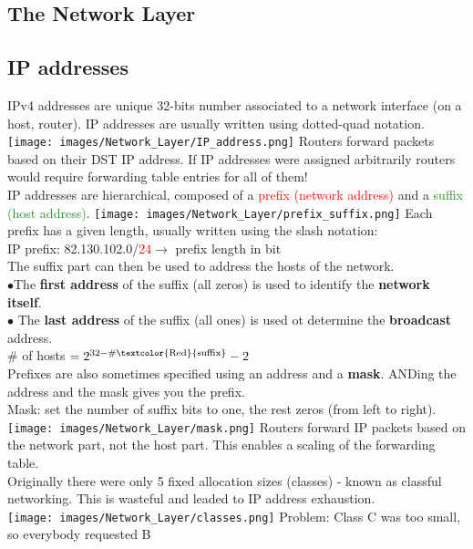 \documentclass[a4paper, fontsize=8pt, landscape, DIV=1]{scrartcl}
\begin{document}
\begin{multicols*}{4}
   		\section{The Network Layer}
   		\subsection{IP addresses}
   		IPv4 addresses are unique 32-bits number associated to a network interface (on a host, router). IP addresses are usually written using dotted-quad notation. 
   		\texttt{[image: images/Network\_Layer/IP\_address.png]}
   		Routers forward packets based on their DST IP address. If IP addresses were assigned arbitrarily routers would require forwarding table entries for all of them!\\
   		IP addresses are hierarchical, composed of a\textcolor{Red}{ prefix (network address)} and a \textcolor{ForestGreen}{suffix (host address)}. 
   		\texttt{[image: images/Network\_Layer/prefix\_suffix.png]}
   		Each prefix has a given length, usually written using the slash notation:\\
   		IP prefix: 82.130.102.0/\textcolor{Red}{24}$\rightarrow$ prefix length in bit\\
   		The suffix part can then be used to address the hosts of the network.\\
   		$\bullet$The \textbf{first address} of the suffix (all zeros) is used to identify the \textbf{network itself}.\\
   		$\bullet$ The \textbf{last address} of the suffix (all ones) is used ot determine the \textbf{broadcast} address.\\
   		\# of hosts $= 2^{32-\#\mathrm{\textcolor{Red}{suffix}}}-2$\\
   		Prefixes are also sometimes specified using an address and a \textbf{mask}. ANDing the address and the mask gives you the prefix. \\
   		Mask: set the number of suffix bits to one, the rest zeros (from left to right).\\
   		\texttt{[image: images/Network\_Layer/mask.png]}
   		Routers forward IP packets based on the network part, not the host part. This enables a scaling of the forwarding table. \\
   		Originally there were only 5 fixed allocation sizes (classes) - known as classful networking. This is wasteful and leaded to IP address exhaustion.\\
   		\texttt{[image: images/Network\_Layer/classes.png]}
   		Problem: Class C was too small, so everybody requested B\\

\end{multicols*}
\end{document}
